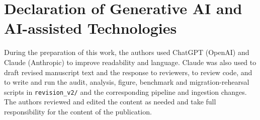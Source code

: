 \documentclass[final,5p,twocolumn,a4paper]{elsarticle}
\begin{document}
\section*{Declaration of Generative AI and AI-assisted Technologies}
During the preparation of this work, the authors used ChatGPT (OpenAI) and Claude (Anthropic) to improve readability and language. Claude was also used to draft revised manuscript text and the response to reviewers, to review code, and to write and run the audit, analysis, figure, benchmark and migration-rehearsal scripts in \texttt{revision\_v2/} and the corresponding pipeline and ingestion changes. The authors reviewed and edited the content as needed and take full responsibility for the content of the publication.

\renewcommand{\bibfont}{\scriptsize}
\setlength{\bibsep}{0pt}


\end{document}
